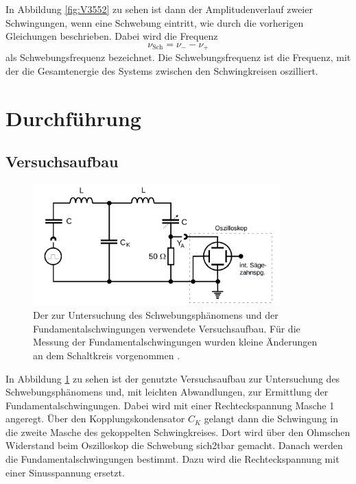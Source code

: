 \documentclass[
  bibliography=totoc,     %
  captions=tableheading,  %
  titlepage=firstiscover, %
]{scrartcl}
\begin{document}
In Abbildung \ref{fig:V3552} zu sehen ist dann der Amplitudenverlauf zweier
Schwingungen, wenn eine Schwebung eintritt, wie durch die vorherigen Gleichungen
beschrieben. Dabei wird die Frequenz
\begin{equation}
\nu_\mathup{Sch} = \nu_--\nu_+
\label{eqn:Lörres}
\end{equation}
als Schwebungsfrequenz bezeichnet. Die Schwebungsfrequenz ist die Frequenz, mit
der die Gesamtenergie des Systems zwischen den Schwingkreisen oszilliert.
\section{Durchführung}
\label{sec:durchführung}

\subsection{Versuchsaufbau}
\label{sec:versuchsaufbau}
\begin{figure}[htb]
  \centering
  \includegraphics[width=0.85\textwidth]{V3554.png}
  \caption{Der zur Untersuchung des Schwebungsphänomens und der Fundamentalschwingungen verwendete Versuchsaufbau. Für die Messung der Fundamentalschwingungen wurden kleine Änderungen an dem Schaltkreis vorgenommen \cite{anleitung}.}
  \label{fig:V3554}
\end{figure}
In Abbildung \ref{fig:V3554} zu sehen ist der genutzte Versuchsaufbau zur
Untersuchung des Schwebungsphänomens und, mit leichten Abwandlungen, zur
Ermittlung der Fundamentalschwingungen. Dabei wird mit einer Rechteckspannung
Masche 1 angeregt. Über den Kopplungskondensator $C_K$ gelangt dann
die Schwingung in die zweite Masche des gekoppelten Schwingkreises. Dort wird
über den Ohmschen Widerstand beim Oszilloskop die Schwebung sich2tbar gemacht.
Danach werden die Fundamentalschwingungen bestimmt. Dazu wird die Rechteckspannung
mit einer Sinusspannung ersetzt.
\end{document}
